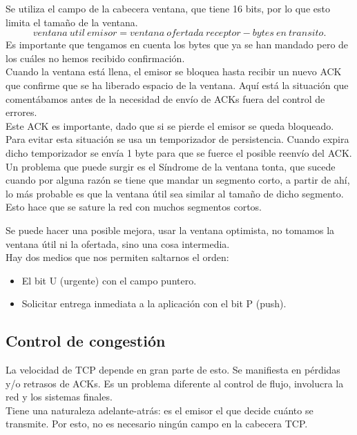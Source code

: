 Se utiliza el campo de la cabecera ventana, que tiene 16 bits, por lo que esto limita el tamaño de la ventana. 
\begin{equation*}
    ventana \ util \ emisor = ventana \ ofertada \ receptor - bytes \ en \ transito.
\end{equation*}
Es importante que tengamos en cuenta los bytes que ya se han mandado pero de los cuáles no hemos recibido confirmación.\\

Cuando la ventana está llena, el emisor se bloquea hasta recibir un nuevo ACK que confirme que se ha liberado espacio de la ventana. Aquí está la situación que comentábamos antes de la necesidad de envío de ACKs fuera del control de errores.\\

Este ACK es importante, dado que si se pierde el emisor se queda bloqueado. Para evitar esta situación se usa un temporizador de persistencia. Cuando expira dicho temporizador se envía 1 byte para que se fuerce el posible reenvío del ACK. \\

Un problema que puede surgir es el Síndrome de la ventana tonta, que sucede cuando por alguna razón se tiene que mandar un segmento corto, a partir de ahí, lo más probable es que la ventana útil sea similar al tamaño de dicho segmento. Esto hace que se sature la red con muchos segmentos cortos. 

Se puede hacer una posible mejora, usar la ventana optimista, no tomamos la ventana útil ni la ofertada, sino una cosa intermedia. \\ 

Hay dos medios que nos permiten saltarnos el orden:
\begin{itemize}
    \item El bit U (urgente) con el campo puntero.
    \item Solicitar entrega inmediata a la aplicación con el bit P (push).
\end{itemize}

\subsection{Control de congestión}
La velocidad de TCP depende en gran parte de esto. Se manifiesta en pérdidas y/o retrasos de ACKs. Es un problema diferente al control de flujo, involucra la red y los sistemas finales. \\

Tiene una naturaleza adelante-atrás: es el emisor el que decide cuánto se transmite. Por esto, no es necesario ningún campo en la cabecera TCP. 

